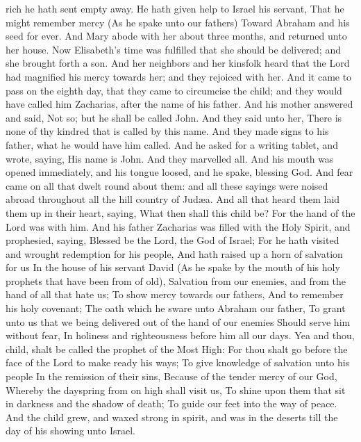rich he hath sent empty away.  He hath given help to Israel his servant, That he might remember mercy  (As he spake unto our fathers) Toward Abraham and his seed for ever.  And Mary abode with her about three months, and returned unto her house.  Now Elisabeth’s time was fulfilled that she should be delivered; and she brought forth a son. And her neighbors and her kinsfolk heard that the Lord had magnified his mercy towards her; and they rejoiced with her. And it came to pass on the eighth day, that they came to circumcise the child; and they would have called him Zacharias, after the name of his father. And his mother answered and said, Not so; but he shall be called John. And they said unto her, There is none of thy kindred that is called by this name. And they made signs to his father, what he would have him called. And he asked for a writing tablet, and wrote, saying, His name is John. And they marvelled all. And his mouth was opened immediately, and his tongue loosed, and he spake, blessing God. And fear came on all that dwelt round about them: and all these sayings were noised abroad throughout all the hill country of Judæa. And all that heard them laid them up in their heart, saying, What then shall this child be? For the hand of the Lord was with him.  And his father Zacharias was filled with the Holy Spirit, and prophesied, saying,  Blessed be the Lord, the God of Israel; For he hath visited and wrought redemption for his people,  And hath raised up a horn of salvation for us In the house of his servant David  (As he spake by the mouth of his holy prophets that have been from of old),  Salvation from our enemies, and from the hand of all that hate us;  To show mercy towards our fathers, And to remember his holy covenant;  The oath which he sware unto Abraham our father,  To grant unto us that we being delivered out of the hand of our enemies Should serve him without fear,  In holiness and righteousness before him all our days.  Yea and thou, child, shalt be called the prophet of the Most High: For thou shalt go before the face of the Lord to make ready his ways;  To give knowledge of salvation unto his people In the remission of their sins,  Because of the tender mercy of our God, Whereby the dayspring from on high shall visit us,  To shine upon them that sit in darkness and the shadow of death; To guide our feet into the way of peace.  And the child grew, and waxed strong in spirit, and was in the deserts till the day of his showing unto Israel. 


